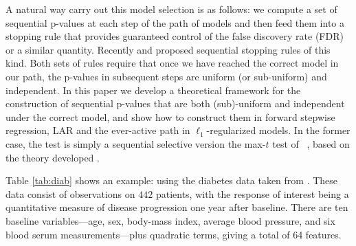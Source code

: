 \documentclass{article}
\begin{document}
A natural way carry out this model selection is as follows: we compute a set  of sequential p-values   at each step of the path of models and then feed them into a stopping rule
that provides guaranteed control of the false discovery rate (FDR) or a similar quantity. Recently  \citet{gsell2013sequential} and \citet{li2015accumulation} proposed sequential stopping rules of this kind.
Both sets of rules require that once we have reached the correct model in our path, the p-values in subsequent steps are uniform (or sub-uniform)
and independent.
In this paper we develop a theoretical framework for the construction of sequential p-values  that are both (sub)-uniform and independent under the correct model,
and show how to construct them  in forward stepwise regression, LAR and the ever-active path in $\ell_1$-regularized models.
In the former case, the test is simply a sequential selective version the max-$t$ test of ~\citet{buja2014}, based on the theory developed \citet{fithian2014optimal}.

Table \ref{tab:diab} shows an example: using the diabetes data taken from \cite{LARS}.
These data consist of  observations on $442$ patients, with the response of interest being a quantitative measure of disease progression one year after baseline.
There are ten baseline variables---age, sex, body-mass index, average blood pressure,
and six blood serum measurements---plus quadratic terms, giving a total of 64 features.
\end{document}
